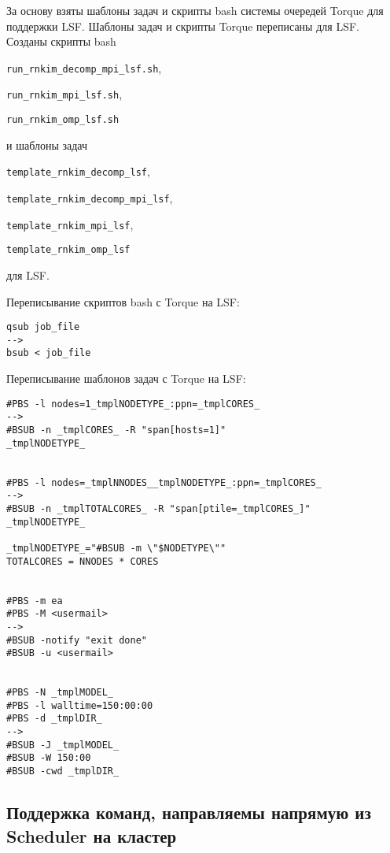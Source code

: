 За основу взяты шаблоны задач и скрипты bash системы очередей Torque для поддержки LSF. Шаблоны задач и скрипты Torque переписаны для LSF. Созданы скрипты bash

\lstinline{run_rnkim_decomp_mpi_lsf.sh},

\lstinline{run_rnkim_mpi_lsf.sh},

\lstinline{run_rnkim_omp_lsf.sh}

и шаблоны задач

\lstinline{template_rnkim_decomp_lsf},

\lstinline{template_rnkim_decomp_mpi_lsf},

\lstinline{template_rnkim_mpi_lsf},

\lstinline{template_rnkim_omp_lsf}

для LSF.

Переписывание скриптов bash с Torque на LSF:
{
\begin{lstlisting}
qsub job_file
-->
bsub < job_file
\end{lstlisting}
}

Переписывание шаблонов задач с Torque на LSF:
\begin{lstlisting}
#PBS -l nodes=1_tmplNODETYPE_:ppn=_tmplCORES_
-->
#BSUB -n _tmplCORES_ -R "span[hosts=1]"
_tmplNODETYPE_


#PBS -l nodes=_tmplNNODES__tmplNODETYPE_:ppn=_tmplCORES_
-->
#BSUB -n _tmplTOTALCORES_ -R "span[ptile=_tmplCORES_]"
_tmplNODETYPE_

_tmplNODETYPE_="#BSUB -m \"$NODETYPE\""
TOTALCORES = NNODES * CORES


#PBS -m ea
#PBS -M <usermail>
-->
#BSUB -notify "exit done"
#BSUB -u <usermail>


#PBS -N _tmplMODEL_
#PBS -l walltime=150:00:00
#PBS -d _tmplDIR_
-->
#BSUB -J _tmplMODEL_
#BSUB -W 150:00
#BSUB -cwd _tmplDIR_
\end{lstlisting}


\subsection{Поддержка команд, направляемы напрямую из Scheduler на кластер}

